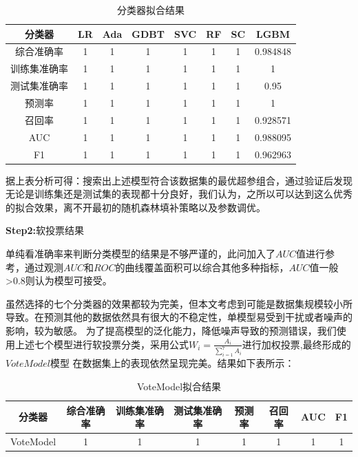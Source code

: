 \documentclass[UTF8]{ctexart}
\begin{document}
\begin{table}[H]
    \centering
    \caption{分类器拟合结果}
    \begin{tabular}{|c|c|c|c|c|c|c|c|}
        \hline
        分类器       & LR & Ada & GDBT & SVC & RF & SC & LGBM     \\ \hline
        综合准确率   & 1  & 1   & 1    & 1   & 1  & 1  & 0.984848 \\ \hline
        训练集准确率 & 1  & 1   & 1    & 1   & 1  & 1  & 1        \\ \hline
        测试集准确率 & 1  & 1   & 1    & 1   & 1  & 1  & 0.95     \\ \hline
        预测率       & 1  & 1   & 1    & 1   & 1  & 1  & 1        \\ \hline
        召回率       & 1  & 1   & 1    & 1   & 1  & 1  & 0.928571 \\ \hline
        AUC          & 1  & 1   & 1    & 1   & 1  & 1  & 0.988095 \\ \hline
        F1           & 1  & 1   & 1    & 1   & 1  & 1  & 0.962963 \\ \hline
    \end{tabular}
\end{table}

据上表分析可得：搜索出上述模型符合该数据集的最优超参组合，通过验证后发现无论是训练集还是测试集的表现都十分良好，我们认为，之所以可以达到这么优秀的拟合效果，离不开最初的随机森林填补策略以及参数调优。

\textbf{Step2:}软投票结果

单纯看准确率来判断分类模型的结果是不够严谨的，此问加入了$AUC$值进行参考，通过观测$AUC$和$ROC$的曲线覆盖面积可以综合其他多种指标，$AUC$值一般>0.8则认为模型可接受。

虽然选择的七个分类器的效果都较为完美，但本文考虑到可能是数据集规模较小所导致。在预测其他的数据依然具有很大的不稳定性，单模型易受到干扰或者噪声的影响，较为敏感。
为了提高模型的泛化能力，降低噪声导致的预测错误，我们使用上述七个模型进行软投票分类，采用公式$W_i = \frac{A_i}{\sum_{i=1}^7 A_i}$进行加权投票,最终形成的$VoteModel$模型
在数据集上的表现依然呈现完美。结果如下表所示：

\begin{table}[H]
    \centering
    \caption{VoteModel拟合结果}
    \begin{tabular}{|c|c|c|c|c|c|c|c|}
        \hline
        分类器    & 综合准确率 & 训练集准确率 & 测试集准确率 & 预测率 & 召回率 & AUC & F1 \\ \hline
        VoteModel & 1          & 1            & 1            & 1      & 1      & 1   & 1  \\ \hline
    \end{tabular}
\end{table}
\end{document}
